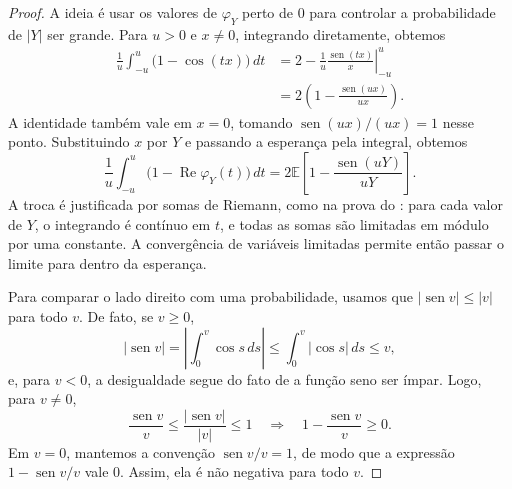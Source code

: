 \documentclass[12pt,portuguese]{article}
\theoremstyle{definition}
\theoremstyle{plainexercise}
\theoremstyle{starredexercise}
\theoremstyle{definition}
\renewcommand{\sin}{\operatorname{sen}}
\begin{document}
\begin{proof}
A ideia é usar os valores de $\varphi_Y$ perto de $0$ para controlar a
probabilidade de $|Y|$ ser grande. Para $u>0$ e $x\neq0$, integrando
diretamente, obtemos
\begin{align*}
\frac{1}{u}\int_{-u}^{u}\bigl(1-\cos(tx)\bigr)\,dt
&=2-\frac{1}{u}\left.\frac{\sin(tx)}{x}\right|_{-u}^{u}\\[0.3cm]
&=2\left(1-\frac{\sin(ux)}{ux}\right).
\end{align*}
A identidade também vale em $x=0$, tomando $\sin(ux)/(ux)=1$ nesse ponto.
Substituindo $x$ por $Y$ e passando a esperança pela integral, obtemos
\begin{equation}\label{eq:continuidade-cauda-identidade}
\frac{1}{u}\int_{-u}^{u}
\bigl(1-\operatorname{Re}\varphi_Y(t)\bigr)\,dt
=2\mathbb{E}\left[1-\frac{\sin(uY)}{uY}\right].
\end{equation}
A troca é justificada por somas de Riemann, como na prova do
: para cada valor de $Y$, o integrando é contínuo em $t$,
e todas as somas são limitadas em módulo por uma constante. A convergência
de variáveis limitadas permite então passar o limite para dentro da esperança.

Para comparar o lado direito com uma probabilidade, usamos que
$|\sin v|\leqslant|v|$ para todo $v$. De fato, se $v\geqslant0$,
\[
|\sin v|=\left|\int_0^v\cos s\,ds\right|
\leqslant\int_0^v|\cos s|\,ds\leqslant v,
\]
e, para $v<0$, a desigualdade segue do fato de a função seno ser ímpar.
Logo, para $v\neq0$,
\[
\frac{\sin v}{v}
\leqslant\frac{|\sin v|}{|v|}
\leqslant1
\quad\Longrightarrow\quad
1-\frac{\sin v}{v}\geqslant0.
\]
Em $v=0$, mantemos a convenção $\sin v/v=1$, de modo que a expressão
$1-\sin v/v$ vale $0$. Assim, ela é não negativa para todo $v$.


\end{proof}
\end{document}
